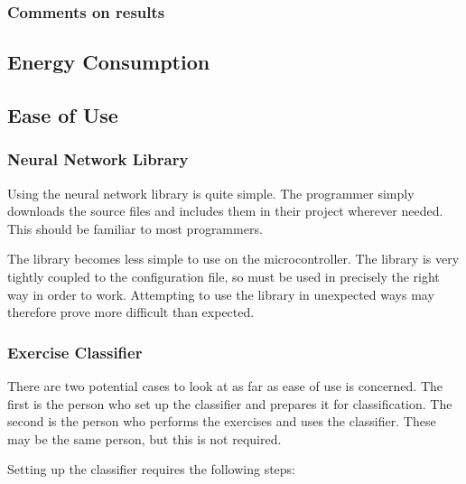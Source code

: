 \documentclass[a4paper]{article}
\begin{document}
\subsubsection{Comments on results}
\label{subsubsec:ev_cp_comments}



\subsection{Energy Consumption}%
\label{subsec:ev_energyconsumption}


\subsection{Ease of Use}%
\label{subsec:ev_eu}

\subsubsection{Neural Network Library}

Using the neural network library is quite simple. The programmer simply downloads the source files and includes them in their project wherever needed. This should be familiar to most programmers.

The library becomes less simple to use on the microcontroller. The library is very tightly coupled to the configuration file, so must be used in precisely the right way in order to work. Attempting to use the library in unexpected ways may therefore prove more difficult than expected.

\subsubsection{Exercise Classifier}

There are two potential cases to look at as far as ease of use is concerned. The first is the person who set up the classifier and prepares it for classification. The second is the person who performs the exercises and uses the classifier. These may be the same person, but this is not required.

Setting up the classifier requires the following steps:
\end{document}
